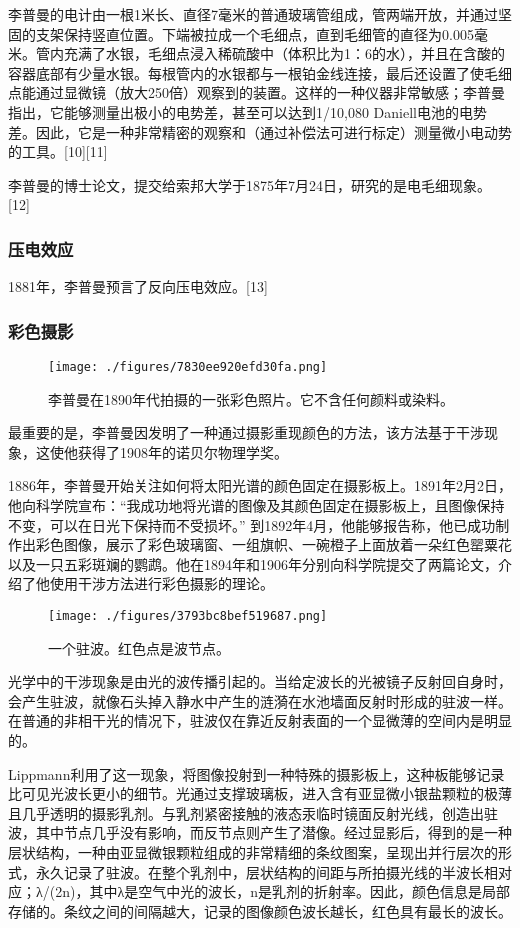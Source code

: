 李普曼的电计由一根1米长、直径7毫米的普通玻璃管组成，管两端开放，并通过坚固的支架保持竖直位置。下端被拉成一个毛细点，直到毛细管的直径为0.005毫米。管内充满了水银，毛细点浸入稀硫酸中（体积比为1：6的水），并且在含酸的容器底部有少量水银。每根管内的水银都与一根铂金线连接，最后还设置了使毛细点能通过显微镜（放大250倍）观察到的装置。这样的一种仪器非常敏感；李普曼指出，它能够测量出极小的电势差，甚至可以达到1/10,080 Daniell电池的电势差。因此，它是一种非常精密的观察和（通过补偿法可进行标定）测量微小电动势的工具。[10][11]

李普曼的博士论文，提交给索邦大学于1875年7月24日，研究的是电毛细现象。[12]
\subsubsection{压电效应}
1881年，李普曼预言了反向压电效应。[13]
\subsubsection{彩色摄影}
\begin{figure}[ht]
\centering
\texttt{[image: ./figures/7830ee920efd30fa.png]}
\caption{李普曼在1890年代拍摄的一张彩色照片。它不含任何颜料或染料。} \label{fig_LPM_4}
\end{figure}
最重要的是，李普曼因发明了一种通过摄影重现颜色的方法，该方法基于干涉现象，这使他获得了1908年的诺贝尔物理学奖。

1886年，李普曼开始关注如何将太阳光谱的颜色固定在摄影板上。1891年2月2日，他向科学院宣布：“我成功地将光谱的图像及其颜色固定在摄影板上，且图像保持不变，可以在日光下保持而不受损坏。” 到1892年4月，他能够报告称，他已成功制作出彩色图像，展示了彩色玻璃窗、一组旗帜、一碗橙子上面放着一朵红色罂粟花以及一只五彩斑斓的鹦鹉。他在1894年和1906年分别向科学院提交了两篇论文，介绍了他使用干涉方法进行彩色摄影的理论。
\begin{figure}[ht]
\centering
\texttt{[image: ./figures/3793bc8bef519687.png]}
\caption{一个驻波。红色点是波节点。} \label{fig_LPM_5}
\end{figure}
光学中的干涉现象是由光的波传播引起的。当给定波长的光被镜子反射回自身时，会产生驻波，就像石头掉入静水中产生的涟漪在水池墙面反射时形成的驻波一样。在普通的非相干光的情况下，驻波仅在靠近反射表面的一个显微薄的空间内是明显的。

Lippmann利用了这一现象，将图像投射到一种特殊的摄影板上，这种板能够记录比可见光波长更小的细节。光通过支撑玻璃板，进入含有亚显微小银盐颗粒的极薄且几乎透明的摄影乳剂。与乳剂紧密接触的液态汞临时镜面反射光线，创造出驻波，其中节点几乎没有影响，而反节点则产生了潜像。经过显影后，得到的是一种层状结构，一种由亚显微银颗粒组成的非常精细的条纹图案，呈现出并行层次的形式，永久记录了驻波。在整个乳剂中，层状结构的间距与所拍摄光线的半波长相对应；λ/(2n)，其中λ是空气中光的波长，n是乳剂的折射率。因此，颜色信息是局部存储的。条纹之间的间隔越大，记录的图像颜色波长越长，红色具有最长的波长。

